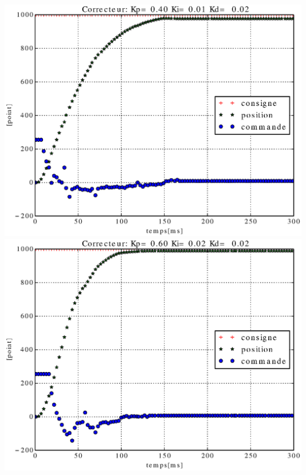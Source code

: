 \documentclass[12pt,a4paper]{article}
\begin{document}
\includegraphics[scale=0.4]{images/figure_essai_11.eps}
\includegraphics[scale=0.4]{images/figure_essai_12.eps}
\end{document}

